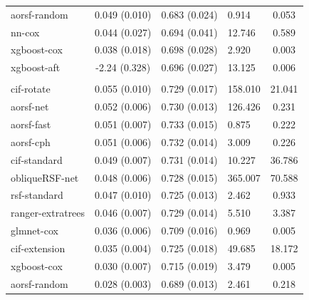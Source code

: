 \documentclass[twoside,11pt]{article}\usepackage[]{graphicx}\usepackage[]{xcolor}
\newenvironment{knitrout}{}{} %
\begin{document}
\begin{knitrout}
\begin{longtable}[t]{lcclc}
\hspace{1em}aorsf-random & 0.049 (0.010) & 0.683 (0.024) & 0.914 & 0.053\\
\hspace{1em}nn-cox & 0.044 (0.027) & 0.694 (0.041) & 12.746 & 0.589\\
\hspace{1em}xgboost-cox & 0.038 (0.018) & 0.698 (0.028) & 2.920 & 0.003\\
\hspace{1em}xgboost-aft & -2.24 (0.328) & 0.696 (0.027) & 13.125 & 0.006\\
\addlinespace[0.3em]
\hline
\multicolumn{5}{l}{\textit{\textbf{Heart Transplant; graft-loss or death, n = 3787, p = 52}}}\\
\hline
\hspace{1em}cif-rotate & 0.055 (0.010) & 0.729 (0.017) & 158.010 & 21.041\\
\hspace{1em}aorsf-net & 0.052 (0.006) & 0.730 (0.013) & 126.426 & 0.231\\
\hspace{1em}aorsf-fast & 0.051 (0.007) & 0.733 (0.015) & 0.875 & 0.222\\
\hspace{1em}aorsf-cph & 0.051 (0.006) & 0.732 (0.014) & 3.009 & 0.226\\
\hspace{1em}cif-standard & 0.049 (0.007) & 0.731 (0.014) & 10.227 & 36.786\\
\hspace{1em}obliqueRSF-net & 0.048 (0.006) & 0.728 (0.015) & 365.007 & 70.588\\
\hspace{1em}rsf-standard & 0.047 (0.010) & 0.725 (0.013) & 2.462 & 0.933\\
\hspace{1em}ranger-extratrees & 0.046 (0.007) & 0.729 (0.014) & 5.510 & 3.387\\
\hspace{1em}glmnet-cox & 0.036 (0.006) & 0.709 (0.016) & 0.969 & 0.005\\
\hspace{1em}cif-extension & 0.035 (0.004) & 0.725 (0.018) & 49.685 & 18.172\\
\hspace{1em}xgboost-cox & 0.030 (0.007) & 0.715 (0.019) & 3.479 & 0.005\\
\hspace{1em}aorsf-random & 0.028 (0.003) & 0.689 (0.013) & 2.461 & 0.218\\

\end{longtable}
\end{knitrout}
\end{document}
